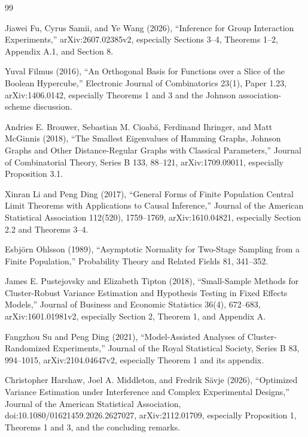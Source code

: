 \documentclass{article}
\begin{document}
\begin{thebibliography}{99}

   Jiawei Fu, Cyrus Samii, and Ye Wang (2026), ``Inference for Group Interaction Experiments,'' arXiv:2607.02385v2, especially Sections 3--4, Theorems 1--2, Appendix A.1, and Section 8.

   Yuval Filmus (2016), ``An Orthogonal Basis for Functions over a Slice of the Boolean Hypercube,'' Electronic Journal of Combinatorics 23(1), Paper 1.23, arXiv:1406.0142, especially Theorems 1 and 3 and the Johnson association-scheme discussion.

   Andries E. Brouwer, Sebastian M. Cioabă, Ferdinand Ihringer, and Matt McGinnis (2018), ``The Smallest Eigenvalues of Hamming Graphs, Johnson Graphs and Other Distance-Regular Graphs with Classical Parameters,'' Journal of Combinatorial Theory, Series B 133, 88--121, arXiv:1709.09011, especially Proposition 3.1.

   Xinran Li and Peng Ding (2017), ``General Forms of Finite Population Central Limit Theorems with Applications to Causal Inference,'' Journal of the American Statistical Association 112(520), 1759--1769, arXiv:1610.04821, especially Section 2.2 and Theorems 3--4.

   Esbjörn Ohlsson (1989), ``Asymptotic Normality for Two-Stage Sampling from a Finite Population,'' Probability Theory and Related Fields 81, 341--352.

   James E. Pustejovsky and Elizabeth Tipton (2018), ``Small-Sample Methods for Cluster-Robust Variance Estimation and Hypothesis Testing in Fixed Effects Models,'' Journal of Business and Economic Statistics 36(4), 672--683, arXiv:1601.01981v2, especially Section 2, Theorem 1, and Appendix A.

   Fangzhou Su and Peng Ding (2021), ``Model-Assisted Analyses of Cluster-Randomized Experiments,'' Journal of the Royal Statistical Society, Series B 83, 994--1015, arXiv:2104.04647v2, especially Theorem 1 and its appendix.

   Christopher Harshaw, Joel A. Middleton, and Fredrik Sävje (2026), ``Optimized Variance Estimation under Interference and Complex Experimental Designs,'' Journal of the American Statistical Association, doi:10.1080/01621459.2026.2627027, arXiv:2112.01709, especially Proposition 1, Theorems 1 and 3, and the concluding remarks.


\end{thebibliography}
\end{document}
